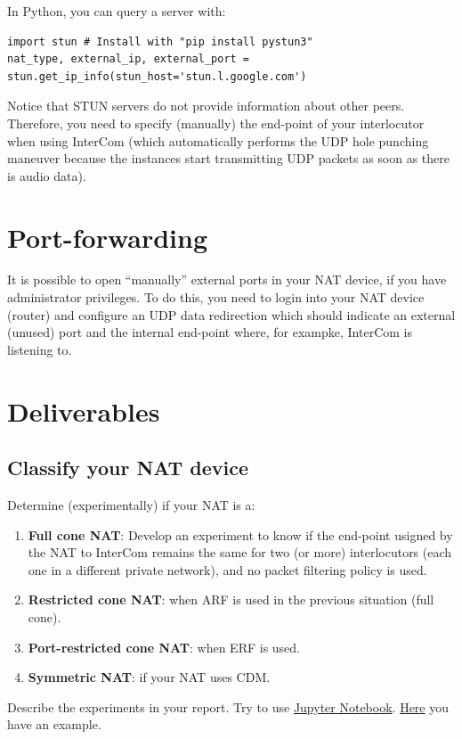 In Python, you can query a server with:
\begin{verbatim}
import stun # Install with "pip install pystun3"
nat_type, external_ip, external_port = stun.get_ip_info(stun_host='stun.l.google.com')
\end{verbatim}

Notice that STUN servers do not provide information about other
peers. Therefore, you need to specify (manually) the end-point of your
interlocutor when using InterCom (which automatically performs the UDP
hole punching maneuver because the instances start transmitting UDP
packets as soon as there is audio data).

\section{Port-forwarding}

It is possible to open ``manually'' external ports in your NAT device,
if you have administrator privileges. To do this, you need to login
into your NAT device (router) and configure an UDP data redirection
which should indicate an external (unused) port and the internal
end-point where, for exampke, InterCom is listening to.

\section{Deliverables}

\subsection*{Classify your NAT device}
Determine (experimentally) if your NAT is a:
\begin{enumerate}
\item \textbf{Full cone NAT}: Develop an experiment to know if the end-point
  usigned by the NAT to InterCom remains the same for two (or more)
  interlocutors (each one in a different private network), and no
  packet filtering policy is used.
\item \textbf{Restricted cone NAT}: when ARF is used in the previous situation (full cone).
\item \textbf{Port-restricted cone NAT}: when ERF is used.
\item \textbf{Symmetric NAT}: if your NAT uses CDM.
\end{enumerate}
Describe the experiments in your report. Try to use
\href{https://jupyter.org/}{Jupyter
  Notebook}. \href{https://github.com/Tecnologias-multimedia/InterCom/blob/master/docs/2-hours_seminar.ipynb}{Here}
you have an example.

